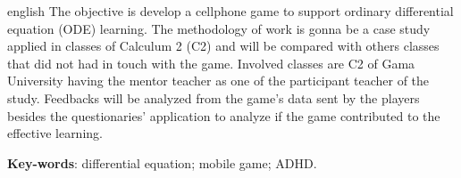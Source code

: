 \begin{resumo}[Abstract]
 \begin{otherlanguage*}{english}     
   The objective is develop a cellphone game to support ordinary differential equation (ODE) learning. The methodology of work is gonna be a case study applied in classes of Calculum 2 (C2) and will be compared with others classes that did not had in touch with the game. Involved classes are C2 of Gama University having the mentor teacher as one of the participant teacher of the study. Feedbacks will be analyzed from the game's data sent by the players besides the questionaries' application to analyze if the game contributed to the effective learning.
   
   \begin{comment}
   metodologia 
   revisão bibliográfica 
   estudo de caso 
      software educacional 
   ensino equações diferenciais ordinárias
   auxílio de aprendizagem de EDO
   Faculdade do Gama
   diagnostico através da avaliação
   aplicação de questionário
   \end{comment}
   

   \vspace{\onelineskip}
 
   \noindent 
   \textbf{Key-words}: differential equation; mobile game; ADHD.
 \end{otherlanguage*}
\end{resumo}
